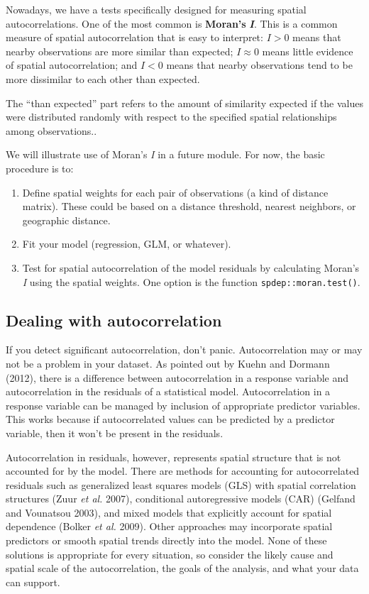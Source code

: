 \documentclass[
  13,
  letterpaper,
]{report}
\providecommand{\tightlist}{%
  \setlength{\itemsep}{0pt}\setlength{\parskip}{0pt}}
\begin{document}
Nowadays, we have a tests specifically designed for measuring spatial
autocorrelations. One of the most common is \textbf{Moran's}
\textbf{\emph{I}}. This is a common measure of spatial autocorrelation
that is easy to interpret: \(I>0\) means that nearby observations are
more similar than expected; \(I\approx0\) means little evidence of
spatial autocorrelation; and \(I<0\) means that nearby observations tend
to be more dissimilar to each other than expected.

The ``than expected'' part refers to the amount of similarity expected
if the values were distributed randomly with respect to the specified
spatial relationships among observations..

We will illustrate use of Moran's \emph{I} in a future module. For now,
the basic procedure is to:

\begin{enumerate}
\def\labelenumi{\arabic{enumi}.}
\tightlist
\item
  Define spatial weights for each pair of observations (a kind of
  distance matrix). These could be based on a distance threshold,
  nearest neighbors, or geographic distance.
\item
  Fit your model (regression, GLM, or whatever).
\item
  Test for spatial autocorrelation of the model residuals by calculating
  Moran's \emph{I} using the spatial weights. One option is the function
  \texttt{spdep::moran.test()}.
\end{enumerate}

\subsection{Dealing with autocorrelation}\label{sec-problems-auto-deal}

If you detect significant autocorrelation, don't panic. Autocorrelation
may or may not be a problem in your dataset. As pointed out by Kuehn and
Dormann (2012), there is a difference between autocorrelation in a
response variable and autocorrelation in the residuals of a statistical
model. Autocorrelation in a response variable can be managed by
inclusion of appropriate predictor variables. This works because if
autocorrelated values can be predicted by a predictor variable, then it
won't be present in the residuals.

Autocorrelation in residuals, however, represents spatial structure that
is not accounted for by the model. There are methods for accounting for
autocorrelated residuals such as generalized least squares models (GLS)
with spatial correlation structures (Zuur \emph{et al.} 2007),
conditional autoregressive models (CAR) (Gelfand and Vounatsou 2003),
and mixed models that explicitly account for spatial dependence (Bolker
\emph{et al.} 2009). Other approaches may incorporate spatial predictors
or smooth spatial trends directly into the model. None of these
solutions is appropriate for every situation, so consider the likely
cause and spatial scale of the autocorrelation, the goals of the
analysis, and what your data can support.
\end{document}
